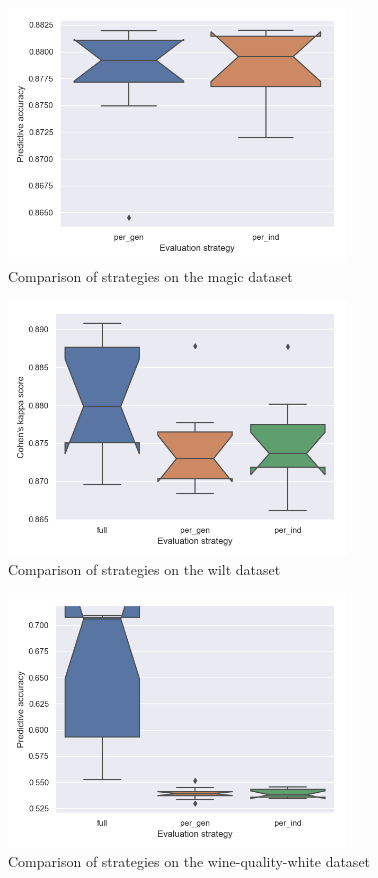\begin{figure}[b!]\centering
\includegraphics[width=0.8\textwidth]{../img/magic-out.png}
\caption{Comparison of strategies on the magic dataset}
\label{pic04:magic}
\end{figure}

\begin{figure}[pt]\centering
\includegraphics[width=0.8\textwidth]{../img/wilt-out.png}
\caption{Comparison of strategies on the wilt dataset}
\label{pic04:wilt}
\end{figure}

\begin{figure}[pt]\centering
\includegraphics[width=0.8\textwidth]{../img/winequality-out.png}
\caption{Comparison of strategies on the wine-quality-white dataset}
\label{pic04:winequality}
\end{figure}

